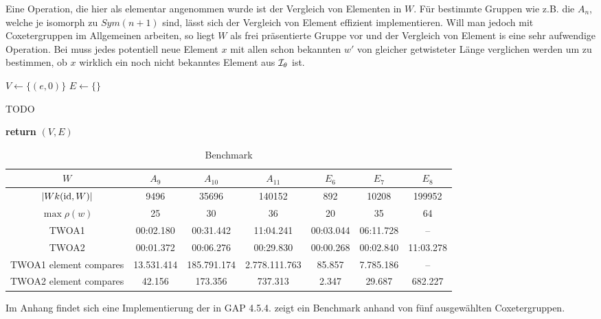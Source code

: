 Eine Operation, die hier als elementar angenommen wurde ist der Vergleich von
Elementen in $W$. Für bestimmte Gruppen wie z.B. die $A_n$, welche je isomorph
zu $Sym(n+1)$ sind, lässt sich der Vergleich von Element effizient
implementieren. Will man jedoch mit Coxetergruppen im Allgemeinen arbeiten, so
liegt $W$ als frei präsentierte Gruppe vor und der Vergleich von Element is eine
sehr aufwendige Operation. Bei  muss jedes
potentiell neue Element $x$ mit allen schon bekannten $w'$ von gleicher
getwisteter Länge verglichen werden um zu bestimmen, ob $x$ wirklich ein noch
nicht bekanntes Element aus $\mathcal{I}_{\theta}$ ist.

\begin{algo}[Algorithmus 2]
\hfill
\label{algo:twoa2}
\begin{algorithmic}[1]
 
\State $V \gets \{(e,0)\}$
\State $E \gets \{\}$

	\State TODO
\EndFor

\State \textbf{return} $(V,E)$
\EndProcedure
\end{algorithmic}
\end{algo}

\begin{table}
\label{tab:benchmark-twoa}
\centering
\begin{tabular}{|c|c|c|c|c|c|c|}
\hline
$W$ & $A_9$ & $A_{10}$ & $A_{11}$ & $E_6$ & $E_7$ & $E_8$
\\
\hline
$|Wk(\operatorname{id},W)|$ & 9496 & 35696 & 140152 & 892 & 10208 & 199952 \\
\hline
$\max \rho(w)$ & 25 & 30 & 36 & 20 & 35 & 64 \\
\hline
TWOA1 & 00:02.180 & 00:31.442 & 11:04.241 & 00:03.044 & 06:11.728 & -- \\
\hline
TWOA2 & 00:01.372 & 00:06.276 & 00:29.830 & 00:00.268 & 00:02.840 & 11:03.278 \\
\hline
TWOA1 element compares & 13.531.414 & 185.791.174 & 2.778.111.763 & 85.857 &
7.785.186 & --
\\
\hline
TWOA2 element compares & 42.156 & 173.356 & 737.313 & 2.347 & 29.687 & 682.227 \\
\hline
\end{tabular}
\caption{Benchmark}
\end{table}

Im Anhang findet sich eine Implementierung der 
in GAP 4.5.4.  zeigt ein Benchmark anhand von fünf
ausgewählten Coxetergruppen.

